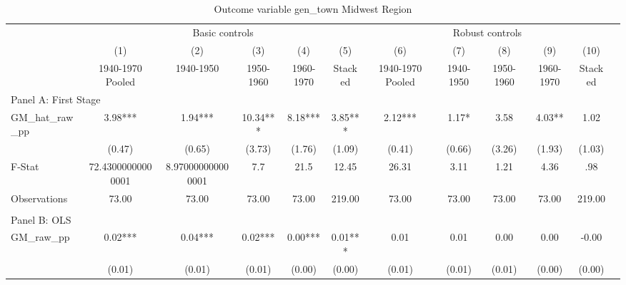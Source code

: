  \begin{table}[htbp]\centering {} \begin{threeparttable} \caption{Outcome variable gen\_town Midwest Region} \begin{tabular}{l*{11}{c}} \toprule
          &\multicolumn{5}{c}{Basic controls}                                   &\multicolumn{5}{c}{Robust controls}                                  \\\cmidrule(lr){2-6}\cmidrule(lr){7-11}
          &\multicolumn{1}{c}{(1)}&\multicolumn{1}{c}{(2)}&\multicolumn{1}{c}{(3)}&\multicolumn{1}{c}{(4)}&\multicolumn{1}{c}{(5)}&\multicolumn{1}{c}{(6)}&\multicolumn{1}{c}{(7)}&\multicolumn{1}{c}{(8)}&\multicolumn{1}{c}{(9)}&\multicolumn{1}{c}{(10)}\\
          &\multicolumn{1}{c}{1940-1970 Pooled}&\multicolumn{1}{c}{1940-1950}&\multicolumn{1}{c}{1950-1960}&\multicolumn{1}{c}{1960-1970}&\multicolumn{1}{c}{Stacked}&\multicolumn{1}{c}{1940-1970 Pooled}&\multicolumn{1}{c}{1940-1950}&\multicolumn{1}{c}{1950-1960}&\multicolumn{1}{c}{1960-1970}&\multicolumn{1}{c}{Stacked}\\
\cmidrule(lr){1-11}
\multicolumn{10}{l}{Panel A: First Stage}\\
\cmidrule(lr){1-11}
GM\_hat\_raw\_pp&      3.98***&      1.94***&     10.34***&      8.18***&      3.85***&      2.12***&      1.17*  &      3.58   &      4.03** &      1.02   \\
          &    (0.47)   &    (0.65)   &    (3.73)   &    (1.76)   &    (1.09)   &    (0.41)   &    (0.66)   &    (3.26)   &    (1.93)   &    (1.03)   \\
\midrule
F-Stat    &72.43000000000001   &8.970000000000001   &       7.7   &      21.5   &     12.45   &     26.31   &      3.11   &      1.21   &      4.36   &       .98   \\
Observations&     73.00   &     73.00   &     73.00   &     73.00   &    219.00   &     73.00   &     73.00   &     73.00   &     73.00   &    219.00   \\
\cmidrule[\heavyrulewidth](lr){1-11} \\ \cmidrule[\heavyrulewidth](lr){1-11}
\multicolumn{10}{l}{Panel B: OLS}\\
\cmidrule(lr){1-11}
GM\_raw\_pp &      0.02***&      0.04***&      0.02***&      0.00***&      0.01***&      0.01   &      0.01   &      0.00   &      0.00   &     -0.00   \\
          &    (0.01)   &    (0.01)   &    (0.01)   &    (0.00)   &    (0.00)   &    (0.01)   &    (0.01)   &    (0.01)   &    (0.00)   &    (0.00)   \\

\end{tabular}
\end{threeparttable}
\end{table}
